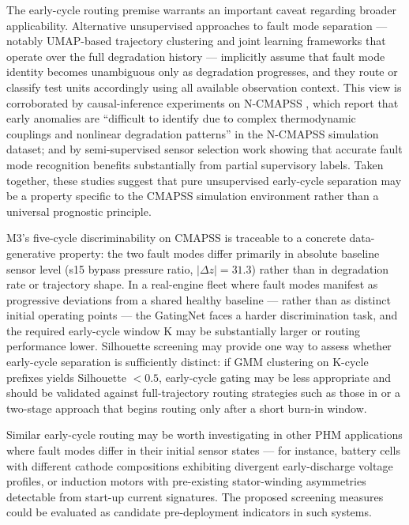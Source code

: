 \documentclass[review,12pt]{elsarticle}
\begin{document}
The early-cycle routing premise warrants an important caveat regarding broader applicability. Alternative unsupervised approaches to fault mode separation — notably UMAP-based trajectory clustering \cite{ref46} and joint learning frameworks that operate over the full degradation history \cite{ref47} — implicitly assume that fault mode identity becomes unambiguous only as degradation progresses, and they route or classify test units accordingly using all available observation context. This view is corroborated by causal-inference experiments on N-CMAPSS \cite{ref48}, which report that early anomalies are ``difficult to identify due to complex thermodynamic couplings and nonlinear degradation patterns'' in the N-CMAPSS simulation dataset; and by semi-supervised sensor selection work \cite{ref49} showing that accurate fault mode recognition benefits substantially from partial supervisory labels. Taken together, these studies suggest that pure unsupervised early-cycle separation may be a property specific to the CMAPSS simulation environment rather than a universal prognostic principle.

M3's five-cycle discriminability on CMAPSS is traceable to a concrete data-generative property: the two fault modes differ primarily in absolute baseline sensor level (s15 bypass pressure ratio, $|\Delta z| = 31.3$) rather than in degradation rate or trajectory shape. In a real-engine fleet where fault modes manifest as progressive deviations from a shared healthy baseline --- rather than as distinct initial operating points --- the GatingNet faces a harder discrimination task, and the required early-cycle window K may be substantially larger or routing performance lower. Silhouette screening may provide one way to assess whether early-cycle separation is sufficiently distinct: if GMM clustering on K-cycle prefixes yields Silhouette $< 0.5$, early-cycle gating may be less appropriate and should be validated against full-trajectory routing strategies such as those in \cite{ref46,ref47} or a two-stage approach that begins routing only after a short burn-in window.

Similar early-cycle routing may be worth investigating in other PHM applications where fault modes differ in their initial sensor states --- for instance, battery cells with different cathode compositions exhibiting divergent early-discharge voltage profiles, or induction motors with pre-existing stator-winding asymmetries detectable from start-up current signatures. The proposed screening measures could be evaluated as candidate pre-deployment indicators in such systems.
\end{document}
